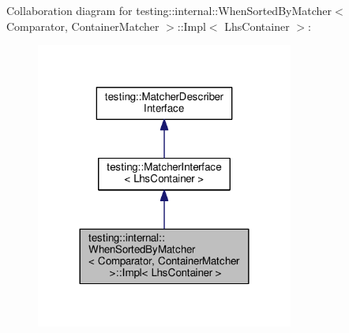 Collaboration diagram for testing\+:\+:internal\+:\+:When\+Sorted\+By\+Matcher$<$ Comparator, Container\+Matcher $>$\+:\+:Impl$<$ Lhs\+Container $>$\+:\nopagebreak
\begin{figure}[H]
\begin{center}
\leavevmode
\includegraphics[width=240pt]{classtesting_1_1internal_1_1WhenSortedByMatcher_1_1Impl__coll__graph}
\end{center}
\end{figure}
